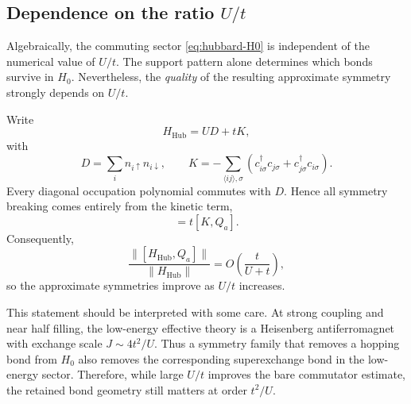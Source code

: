 \documentclass[11pt]{article}
\theoremstyle{definition}
\theoremstyle{remark}
\begin{document}
\subsection{Dependence on the ratio $U/t$}
Algebraically, the commuting sector \eqref{eq:hubbard-H0} is independent of the numerical value of $U/t$. The support pattern alone determines which bonds survive in $H_0$. Nevertheless, the \emph{quality} of the resulting approximate symmetry strongly depends on $U/t$.

Write
\begin{equation}
  H_{\mathrm{Hub}} = U D + t K,
\end{equation}
with
\begin{equation}
  D=\sum_i n_{i\uparrow}n_{i\downarrow},
  \qquad
  K=-\sum_{\langle ij\rangle,\sigma}
  \left(c_{i\sigma}^\dagger c_{j\sigma}+c_{j\sigma}^\dagger c_{i\sigma}\right).
\end{equation}
Every diagonal occupation polynomial commutes with $D$. Hence all symmetry breaking comes entirely from the kinetic term,
\begin{equation}
  [H_{\mathrm{Hub}},Q_a]=t[K,Q_a].
\end{equation}
Consequently,
\begin{equation}
  \frac{\|[H_{\mathrm{Hub}},Q_a]\|}{\|H_{\mathrm{Hub}}\|}
  =O\!\left(\frac{t}{U+t}\right),
\end{equation}
so the approximate symmetries improve as $U/t$ increases.

This statement should be interpreted with some care. At strong coupling and near half filling, the low-energy effective theory is a Heisenberg antiferromagnet with exchange scale $J\sim 4t^2/U$. Thus a symmetry family that removes a hopping bond from $H_0$ also removes the corresponding superexchange bond in the low-energy sector. Therefore, while large $U/t$ improves the bare commutator estimate, the retained bond geometry still matters at order $t^2/U$.
\end{document}

